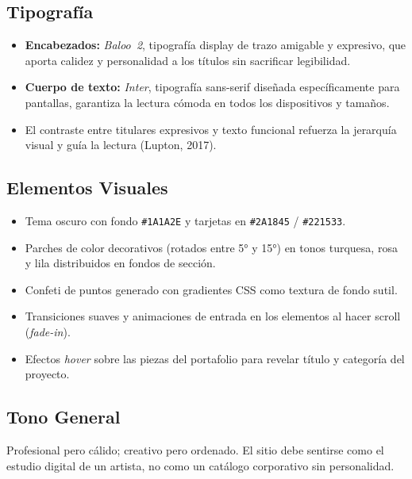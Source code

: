\documentclass[12pt, letterpaper]{article}
\begin{document}
\subsection{Tipografía}

\begin{itemize}
  \item \textbf{Encabezados:} \textit{Baloo~2}, tipografía display de trazo amigable y expresivo, que aporta calidez y personalidad a los títulos sin sacrificar legibilidad.
  \item \textbf{Cuerpo de texto:} \textit{Inter}, tipografía sans-serif diseñada específicamente para pantallas, garantiza la lectura cómoda en todos los dispositivos y tamaños.
  \item El contraste entre titulares expresivos y texto funcional refuerza la jerarquía visual y guía la lectura (Lupton, 2017).
\end{itemize}

\subsection{Elementos Visuales}

\begin{itemize}
  \item Tema oscuro con fondo \texttt{\#1A1A2E} y tarjetas en \texttt{\#2A1845} / \texttt{\#221533}.
  \item Parches de color decorativos (rotados entre 5° y 15°) en tonos turquesa, rosa y lila distribuidos en fondos de sección.
  \item Confeti de puntos generado con gradientes CSS como textura de fondo sutil.
  \item Transiciones suaves y animaciones de entrada en los elementos al hacer scroll (\textit{fade-in}).
  \item Efectos \textit{hover} sobre las piezas del portafolio para revelar título y categoría del proyecto.
\end{itemize}

\subsection{Tono General}

Profesional pero cálido; creativo pero ordenado. El sitio debe sentirse como el estudio digital de un artista, no como un catálogo corporativo sin personalidad.


\end{document}
